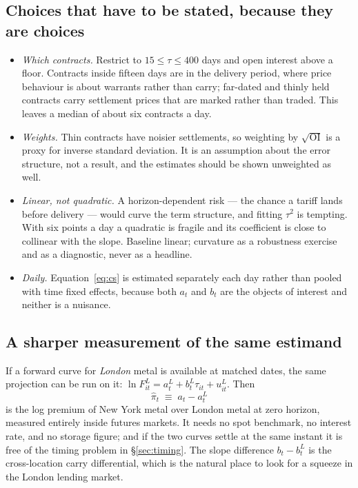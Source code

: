 \documentclass[11pt,a4paper]{article}
\begin{document}
\subsection*{Choices that have to be stated, because they are choices}

\begin{itemize}[leftmargin=1.2em,itemsep=2pt,topsep=2pt]
\item \emph{Which contracts.} Restrict to $15\le\tau\le 400$ days and open
interest above a floor. Contracts inside fifteen days are in the delivery
period, where price behaviour is about warrants rather than carry; far-dated
and thinly held contracts carry settlement prices that are marked rather than
traded. This leaves a median of about six contracts a day.
\item \emph{Weights.} Thin contracts have noisier settlements, so weighting by
$\sqrt{\mathrm{OI}}$ is a proxy for inverse standard deviation. It is an
assumption about the error structure, not a result, and the estimates should be
shown unweighted as well.
\item \emph{Linear, not quadratic.} A horizon-dependent risk --- the chance a
tariff lands before delivery --- would curve the term structure, and fitting
$\tau^2$ is tempting. With six points a day a quadratic is fragile and its
coefficient is close to collinear with the slope. Baseline linear; curvature as
a robustness exercise and as a diagnostic, never as a headline.
\item \emph{Daily.} Equation~\eqref{eq:cs} is estimated separately each day
rather than pooled with time fixed effects, because both $a_t$ and $b_t$ are
the objects of interest and neither is a nuisance.
\end{itemize}

\subsection*{A sharper measurement of the same estimand}

If a forward curve for \emph{London} metal is available at matched dates, the
same projection can be run on it:
$\ln F^{L}_{it} = a^{L}_t + b^{L}_t \tau_{it} + u^{L}_{it}$. Then
\begin{equation}
\widehat{\pi}_t \;\equiv\; a_t - a^{L}_t
\label{eq:twocurve}
\end{equation}
is the log premium of New York metal over London metal at zero horizon,
measured entirely inside futures markets. It needs no spot benchmark, no
interest rate, and no storage figure; and if the two curves settle at the same
instant it is free of the timing problem in \S\ref{sec:timing}. The slope
difference $b_t-b^{L}_t$ is the cross-location carry differential, which is the
natural place to look for a squeeze in the London lending market.
\end{document}
